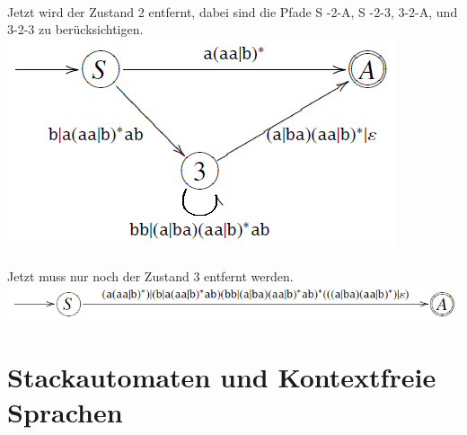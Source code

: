 \documentclass[a4paper]{article}
\begin{document}
\begin{falgo}[Beispiel]
		\\
		Jetzt wird der Zustand 2 entfernt, dabei sind die Pfade S -2-A, S -2-3, 3-2-A, und 3-2-3 zu berücksichtigen. \\
		\includegraphics[scale=0.6]{vnea_beispiel_4.png} \\
		\\
		Jetzt muss nur noch der Zustand 3 entfernt werden. \\
		\includegraphics[scale=0.6]{vnea_beispiel_5.png}
	\end{falgo}



\newpage
\section{Stackautomaten und Kontextfreie Sprachen}
\end{document}

